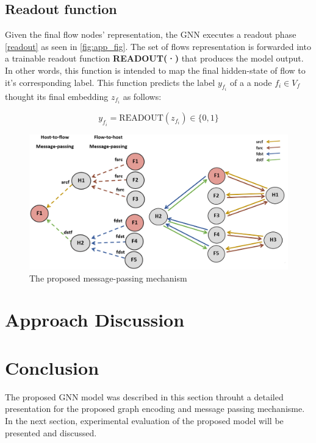 \subsection{Readout function}

Given the final flow nodes' representation, the GNN executes a readout phase \ref{readout} as seen in \ref{fig:app_fig}. The set of flows representation is forwarded into a trainable readout function \textbf{READOUT(·)} that produces the model output. 
In other words, this function is intended to map the final hidden-state of flow to it's corresponding label. This function predicts the label $y_{f_i}$ of a a node $f_i \in V_f$ thought its final embedding  $z_{f_i}$ as follows:

\begin{equation}
    y_{f_i} = \text{READOUT} (z_{f_i} ) \in \{0, 1\}
\end{equation}

\begin{figure}[H]
    \centering
    \includegraphics[scale=0.45]{figures/approche_cg.png}
    \captionsetup{font=large}
    \caption{The proposed message-passing mechanism}
    \label{fig:approche_cg}
\end{figure}


\section{Approach Discussion}
\section{Conclusion}
The proposed GNN model was described in this section throuht a detailed presentation for the proposed graph encoding and message passing mechanisme. In the next section, experimental evaluation of the proposed model will be presented and discussed.




